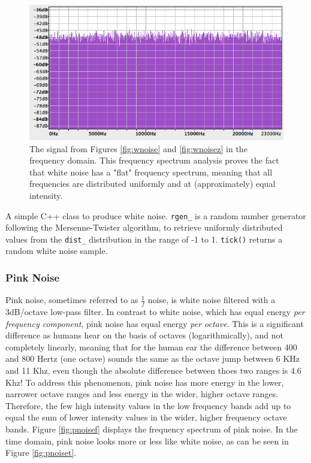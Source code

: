   \begin{figure}[h!]
    \includegraphics[scale=0.6]{img/wnoisef}
    \caption{The signal from Figures \ref{fig:wnoise} and \ref{fig:wnoisez} in the frequency domain. This frequency spectrum analysis proves the fact that white noise has a "flat" frequency spectrum, meaning that all frequencies are  distributed uniformly and at (approximately) equal intensity. }
    \label{fig:wnoisef}
  \end{figure}

  \begin{table}
    \caption{A simple C++ class to produce white noise. \texttt{rgen\_} is a random number generator following the Mersenne-Twister algorithm, to retrieve uniformly distributed values from the \texttt{dist\_} distribution in the range of -1 to 1. \texttt{tick()} returns a random white noise sample. }
    \label{code:wnoise}
  \end{table}

  \subsubsection{Pink Noise}

  Pink noise, sometimes referred to as $\frac{1}{f}$ noise, is white noise filtered with a 3dB/octave low-pass filter. In contrast to white noise, which has equal energy \emph{per frequency component}, pink noise has equal energy \emph{per octave}. This is a significant difference as humans hear on the basis of octaves (logarithmically), and not completely linearly, meaning that for the human ear the difference between 400 and 800 Hertz (one octave) sounds the same as the octave jump between 6 KHz and 11 Khz, even though the absolute difference between thoes two ranges is 4.6 Khz! To address this phenomenon, pink noise has more energy in the lower, narrower octave ranges and less energy in the wider, higher octave ranges. Therefore, the few high intensity values in the low frequency bands add up to equal the sum of lower intensity values in the wider, higher frequency octave bands. Figure \ref{fig:pnoisef} displays the frequency spectrum of pink noise. In the time domain, pink noise looks more or less like white noise, as can be seen in Figure \ref{fig:pnoiset}.

